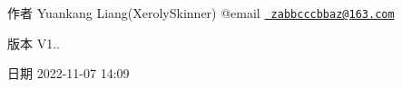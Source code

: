 \begin{DoxyAuthor}{作者}
Yuankang Liang(\+Xeroly\+Skinner) @email \href{mailto:zabbcccbbaz@163.com}{\texttt{ zabbcccbbaz@163.\+com}} 
\end{DoxyAuthor}
\begin{DoxyVersion}{版本}
V1.. 
\end{DoxyVersion}
\begin{DoxyDate}{日期}
2022-\/11-\/07 14\+:09 
\end{DoxyDate}
